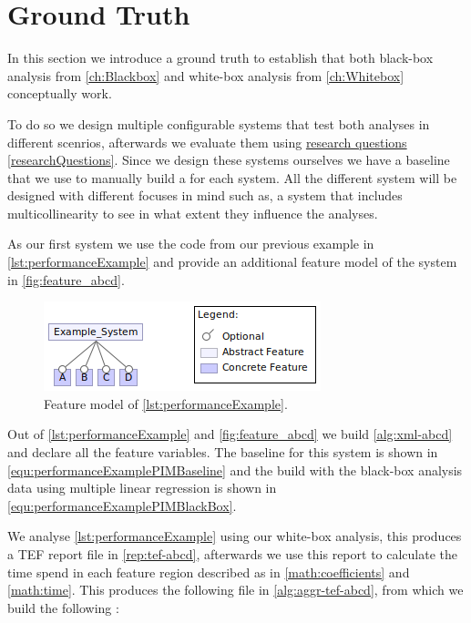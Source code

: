 \section{Ground Truth}\label{sec:ground-truth}
In this section we introduce a ground truth to establish that both black-box analysis from \autoref{ch:Blackbox} and white-box analysis from 
\autoref{ch:Whitebox} conceptually work. 

To do so we design multiple configurable systems that test both analyses in different scenrios, afterwards we evaluate
them using \hyperref[researchQuestions]{research questions \ref*{researchQuestions}}. Since we design these systems ourselves we have 
a baseline that we use to manually build a \perfInfluenceModel for each system. All the different system will be designed with different focuses in mind
such as, a system that includes multicollinearity to see in what extent they influence the analyses.

As our first system we use the code from our previous example in \autoref{lst:performanceExample} and provide an additional feature model of the system in 
\autoref{fig:feature_abcd}. 

\begin{figure}[h]
    \centering
    \includegraphics[scale=0.55]{gfx/Feature_ABCD.png}
    \caption{Feature model of \autoref{lst:performanceExample}.}
    \label{fig:feature_abcd}
\end{figure}

Out of \autoref{lst:performanceExample} and \autoref{fig:feature_abcd} we build \autoref{alg:xml-abcd} and declare all the feature variables. The baseline 
{\perfInfluenceModel} for this system is shown in \autoref{equ:performanceExamplePIMBaseline} and the {\perfInfluenceModel} build with the black-box
analysis data using multiple linear regression is shown in \autoref{equ:performanceExamplePIMBlackBox}. 

We analyse \autoref{lst:performanceExample} using our white-box analysis, this produces a TEF report file in \autoref{rep:tef-abcd},
afterwards we use this report to calculate the time spend in each feature region described as in \autoref{math:coefficients} and \autoref{math:time}.
This produces the following file in \autoref{alg:aggr-tef-abcd}, from which we build the following {\perfInfluenceModel}:

